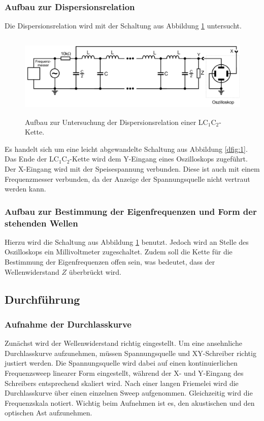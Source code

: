 \subsubsection{Aufbau zur Dispersionsrelation}
Die Dispersionsrelation wird mit der Schaltung aus Abbildung \ref{dfig:2} untersucht.

\begin{figure}[H]
  \centering
  \includegraphics[height=4cm]{dispersion.png}
  \caption{Aufbau zur Untersuchung der Dispersionsrelation einer LC$_1$C$_2$-Kette.}
  \label{dfig:2}
\end{figure}

Es handelt sich um eine leicht abgewandelte Schaltung aus Abbildung \ref{dfig:1}.
Das Ende der LC$_1$C$_2$-Kette wird dem Y-Eingang eines Oszilloskops zugeführt.
Der X-Eingang wird mit der Speisespannung verbunden.
Diese ist auch mit einem Frequenzmesser verbunden, da der Anzeige der Spannungsquelle nicht vertraut werden kann.

\subsubsection{Aufbau zur Bestimmung der Eigenfrequenzen und Form der stehenden Wellen}
Hierzu wird die Schaltung aus Abbildung \ref{dfig:2} benutzt.
Jedoch wird an Stelle des Oszilloskops ein Millivoltmeter zugeschaltet.
Zudem soll die Kette für die Bestimmung der Eigenfrequenzen offen sein, was bedeutet, dass der Wellenwiderstand $Z$ überbrückt wird.

\subsection{Durchführung}
\subsubsection{Aufnahme der Durchlasskurve}
Zunächst wird der Wellenwiderstand richtig eingestellt.
Um eine ansehnliche Durchlasskurve aufzunehmen, müssen Spannungsquelle und XY-Schreiber richtig justiert werden.
Die Spannungsquelle wird dabei auf einen kontinuierlichen Frequenzsweep linearer Form eingestellt, während der X- und Y-Eingang des Schreibers entsprechend skaliert wird.
Nach einer langen Friemelei wird die Durchlasskurve über einen einzelnen Sweep aufgenommen.
Gleichzeitig wird die Frequenzskala notiert.
Wichtig beim Aufnehmen ist es, den akustischen und den optischen Ast aufzunehmen.

